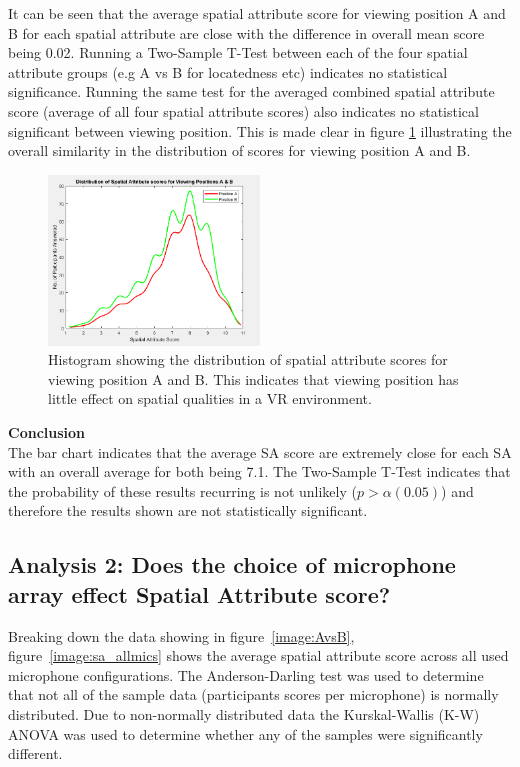 \documentclass{aes2e}
\begin{document}
		It can be seen that the average spatial attribute score for viewing position A and B for each spatial attribute are close with the difference in overall mean score being 0.02. Running a Two-Sample T-Test between each of the four spatial attribute groups (e.g A vs B for locatedness etc) indicates no statistical significance. Running the same test for the averaged combined spatial attribute score (average of all four spatial attribute scores) also indicates no statistical significant between viewing position. This is made clear in figure \ref{image:AvsB_dist} illustrating the overall similarity in the distribution of scores for viewing position A and B. \\
		
		\begin{figure}
			\includegraphics[width=0.5\textwidth]{images/stats/AvsB_sa_stack_all.PNG}
			\caption{Histogram showing the distribution of spatial attribute scores for viewing position A and B. This indicates that viewing position has little effect on spatial qualities in a VR environment.}
			\label{image:AvsB_dist} 
		\end{figure}

		\textbf{Conclusion}\\

		The bar chart indicates that the average SA score are extremely close for each SA with an overall average for both being 7.1. The Two-Sample T-Test indicates that the probability of these results recurring is not unlikely ($p > \alpha (0.05)$) and therefore the results shown are not statistically significant.


	\subsection{Analysis 2: Does the choice of microphone array effect Spatial Attribute score?}
	\label{ana2}

		Breaking down the data showing in figure~\ref{image:AvsB}, figure~\ref{image:sa_allmics} shows the average spatial attribute score across all used microphone configurations. The Anderson-Darling test was used to determine that not all of the sample data (participants scores per microphone) is normally distributed. Due to non-normally distributed data the Kurskal-Wallis (K-W) ANOVA was used to determine whether any of the samples were significantly different. \\
\end{document}
